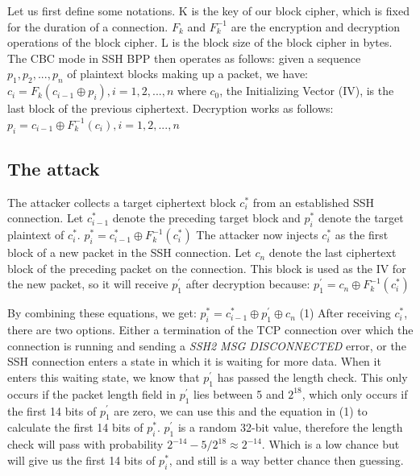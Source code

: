 \documentclass[twocolumn]{article}
\begin{document}
\indent Let us first define some notations. K is the key of our block cipher, which is fixed for the duration of a connection. $F_k$ and $F^{-1}_k$ are the encryption and decryption operations of the block cipher. L is the block size of the block cipher in bytes. The CBC mode in SSH BPP then operates as follows: given a sequence $p_1,p_2,...,p_n$ of plaintext blocks making up a packet, we have: 
$c_i = F_k(c_{i-1} \oplus p_i), i = 1,2,...,n$
where $c_0$, the Initializing Vector (IV), is the last block of the previous ciphertext. Decryption works as follows: $p_i = c_{i-1} \oplus F^{-1}_k(c_i), i = 1,2,...,n$

\subsection*{The attack}

The attacker collects a target ciphertext block $c_i^*$ from an established SSH connection. Let $c_{i-1}^*$ denote the preceding target block and $p_i^*$ denote the target plaintext of $c_i^*$.
$p_i^* = c_{i-1}^* \oplus F^{-1}_k(c_i^*)$
The attacker now injects $c_i^*$ as the first block of a new packet in the SSH connection. Let $c_n$ denote the last ciphertext block of the preceding packet on the connection. This block is used as the IV for the new packet, so it will receive $p^{'}_1$ after decryption because: $p^{'}_1 = c_n \oplus F^{-1}_k(c_i^*)$




\indent By combining these equations, we get: $p_i^* = c_{i-1}^* \oplus p^{'}_1 \oplus c_n$ (1)
After receiving $c_i^*$, there are two options. Either a termination of the TCP connection over which the connection is running and sending a \textit{SSH2 MSG DISCONNECTED} error, or the SSH connection enters a state in which it is waiting for more data. When it enters this waiting state, we know that $p^{'}_1$ has passed the length check. This only occurs if the packet length field in $p^{'}_1$ lies between 5 and $2^{18}$, which only occurs if the first 14 bits of $p^{'}_1$ are zero, we can use this and the equation in (1) to calculate the first 14 bits of $p_i^*$. $p^{'}_1$ is a random 32-bit value, therefore the length check will pass with probability $2^{-14} - 5/2^{18} \approx 2^{-14}$. Which is a low chance but will give us the first 14 bits of $p^*_i$, and still is a way better chance then guessing.


\end{document}
